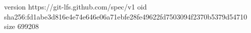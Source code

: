 version https://git-lfs.github.com/spec/v1
oid sha256:fd1abe3d816e4e74e646e06a71ebfe28fe49622fd7503094f2370b5379d54710
size 699208
